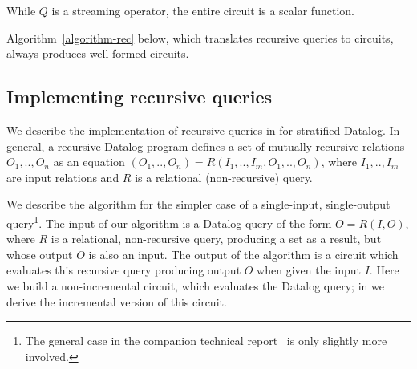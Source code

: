 While $Q$ is a streaming operator, the entire circuit is a scalar
function.

Algorithm~\ref{algorithm-rec} below, which translates recursive queries to
\dbsp circuits, always produces well-formed circuits.

\subsection{Implementing recursive queries}\label{sec:datalog}

We describe the implementation of recursive queries in \dbsp for
stratified Datalog.
In general, a recursive Datalog program defines a set of
mutually recursive relations $O_1,..,O_n$ as an equation
$(O_1,..,O_n)=R(I_1,..,I_m, O_1,..,O_n)$, where $I_1,..,I_m$ are
input relations and $R$ is a relational (non-recursive) query.

We describe the algorithm for
the simpler case of a single-input, single-output query\footnote{The general case
in the companion technical report~\cite{tr} is only
slightly more involved.}.  The input of our algorithm is a Datalog query of the form
$O = R(I, O)$, where $R$ is a relational, non-recursive query,
producing a set as a result, but whose output $O$ is also an input.
The output of the algorithm is a \dbsp circuit which evaluates this
recursive query producing output $O$ when given the input $I$.  Here we build
a non-incremental circuit, which evaluates the Datalog query;
in  we derive the incremental version
of this circuit.


